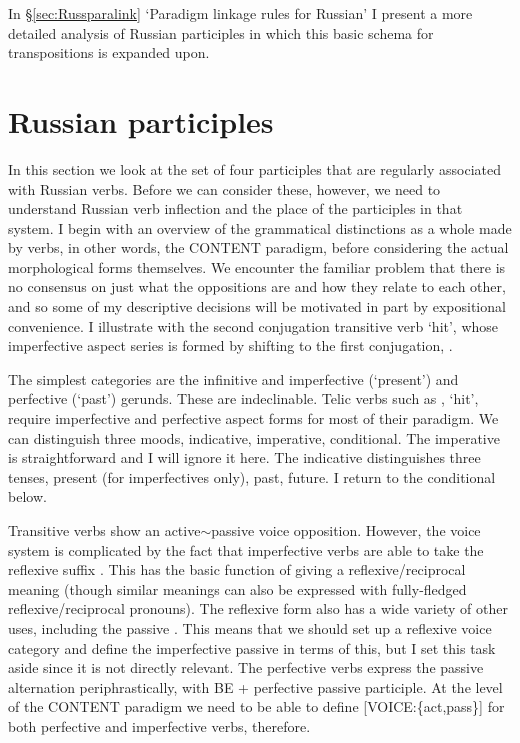 \documentclass[output=paper,
modfonts
]{LSP/langsci}
\begin{document}
In \S\ref{sec:Russparalink} ‘Paradigm linkage rules for Russian’ I present a more detailed analysis of Russian participles in which this basic schema for transpositions is expanded upon.

\section{Russian participles}  \label{sec:Russianptcps}


In this section we look at the set of four participles that are regularly associated with Russian verbs. Before we can consider these, however, we need to understand  Russian verb inflection and the place of the participles in that system. I begin with an overview of the grammatical distinctions as a whole made by verbs, in other words, the CONTENT paradigm, before considering the actual morphological forms themselves. We encounter the familiar problem that there is no consensus on  just what the oppositions are and how they relate to each other, and so some of my descriptive decisions will be motivated in part by expositional convenience. I illustrate with the second conjugation transitive verb  ‘hit’, whose imperfective aspect series is formed by shifting to the first conjugation, .  

\begin{sloppypar}%
The simplest categories are the infinitive and  imperfective (‘present’) and perfective (‘past’) gerunds. These are indeclinable. Telic verbs such as , ‘hit’, require imperfective and perfective aspect forms for most of their paradigm. We can distinguish three moods, indicative, imperative, conditional. The imperative is straightforward and I will ignore it here. The indicative distinguishes three tenses, present (for imperfectives only), past, future. I return to the conditional below.
\end{sloppypar}%

Transitive verbs show an active$\sim$passive voice opposition. However, the voice system is complicated by the fact that imperfective verbs are able to take the reflexive suffix . This has the basic function of giving a reflexive/reciprocal meaning (though similar meanings can also be expressed with fully-fledged reflexive/reciprocal pronouns). The reflexive form also has a wide variety of other uses, including the passive \parencite{Gerritsen90:book}. This means that we should set up a reflexive voice category and define the imperfective passive in terms of this, but I set this task aside since it is not directly relevant. The perfective verbs express the passive alternation periphrastically, with BE + perfective passive participle. At the level of the CONTENT paradigm we need to be able to define [VOICE:\{act,pass\}] for both perfective and imperfective verbs, therefore.  
\end{document}
